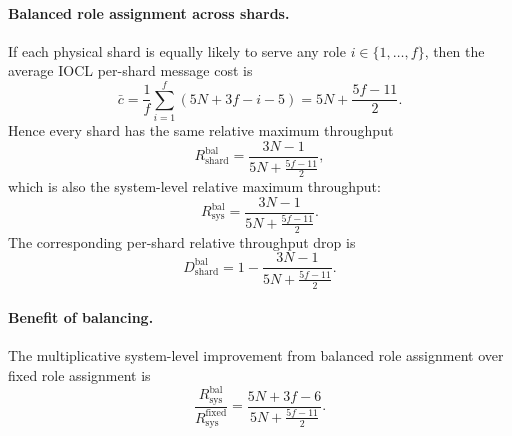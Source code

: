 \paragraph{Balanced role assignment across shards.}
If each physical shard is equally likely to serve any role $i \in \{1,\dots,f\}$,
then the average IOCL per-shard message cost is
\[
\bar c
=
\frac{1}{f}\sum_{i=1}^{f}(5N+3f-i-5)
=
5N+\frac{5f-11}{2}.
\]
Hence every shard has the same relative maximum throughput
\[
R_{\mathrm{shard}}^{\mathrm{bal}}
=
\frac{3N-1}{5N+\frac{5f-11}{2}},
\]
which is also the system-level relative maximum throughput:
\[
R_{\mathrm{sys}}^{\mathrm{bal}}
=
\frac{3N-1}{5N+\frac{5f-11}{2}}.
\]
The corresponding per-shard relative throughput drop is
\[
D_{\mathrm{shard}}^{\mathrm{bal}}
=
1 - \frac{3N-1}{5N+\frac{5f-11}{2}}.
\]

\paragraph{Benefit of balancing.}
The multiplicative system-level improvement from balanced role assignment over fixed role assignment is
\[
\frac{R_{\mathrm{sys}}^{\mathrm{bal}}}{R_{\mathrm{sys}}^{\mathrm{fixed}}}
=
\frac{5N+3f-6}{5N+\frac{5f-11}{2}}.
\]

 
